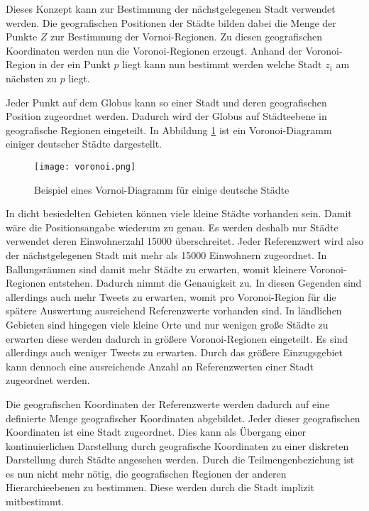 			Dieses Konzept kann zur Bestimmung der nächstgelegenen Stadt verwendet werden. 
			Die geografischen Positionen der Städte bilden dabei die Menge der Punkte $Z$ zur Bestimmung der Vornoi-Regionen.
			Zu diesen geografischen Koordinaten werden nun die Voronoi-Regionen erzeugt. 
			Anhand der Voronoi-Region in der ein Punkt $p$ liegt kann nun bestimmt werden welche Stadt $z_i$ am nächsten zu $p$ liegt.

			Jeder Punkt auf dem Globus kann so einer Stadt und deren geografischen Position zugeordnet werden.
			Dadurch wird der Globus auf Städteebene in geografische Regionen eingeteilt.
			In Abbildung \ref{img:voronoi} ist ein Voronoi-Diagramm einiger deutscher Städte dargestellt.

			\begin{figure}[h!]
				\begin{center}
				\texttt{[image: voronoi.png]}
				\caption{Beispiel eines Vornoi-Diagramm für einige deutsche Städte}
				\label{img:voronoi}
				\end{center}
			\end{figure}	


			In dicht besiedelten Gebieten können viele kleine Städte vorhanden sein. 
			Damit wäre die Positionsangabe wiederum zu genau.
			Es werden deshalb nur Städte verwendet deren Einwohnerzahl 15000 überschreitet.
			Jeder Referenzwert wird also der nächstgelegenen Stadt mit mehr als 15000 Einwohnern zugeordnet.
			In Ballungsräumen sind damit mehr Städte zu erwarten, womit kleinere Voronoi-Regionen entstehen.
			Dadurch nimmt die Genauigkeit zu.
			In diesen Gegenden sind allerdings auch mehr Tweets zu erwarten, womit pro Voronoi-Region für die spätere Auswertung ausreichend Referenzwerte vorhanden sind. 
			In ländlichen Gebieten sind hingegen viele kleine Orte und nur wenigen große Städte zu erwarten diese werden dadurch in größere Voronoi-Regionen eingeteilt.
			Es sind allerdings auch weniger Tweets zu erwarten. 
			Durch das größere Einzugsgebiet kann dennoch eine ausreichende Anzahl an Referenzwerten einer Stadt zugeordnet werden. 

			Die geografischen Koordinaten der Referenzwerte werden dadurch auf eine definierte Menge geografischer Koordinaten abgebildet. 
			Jeder dieser geografischen Koordinaten ist eine Stadt zugeordnet.
			Dies kann als Übergang einer kontinuierlichen Darstellung durch geografische Koordinaten zu einer diskreten Darstellung durch Städte angesehen werden. 
			Durch die Teilmengenbeziehung ist es nun nicht mehr nötig, die geografischen Regionen der anderen Hierarchieebenen zu bestimmen. 
			Diese werden durch die Stadt implizit mitbestimmt.
			
